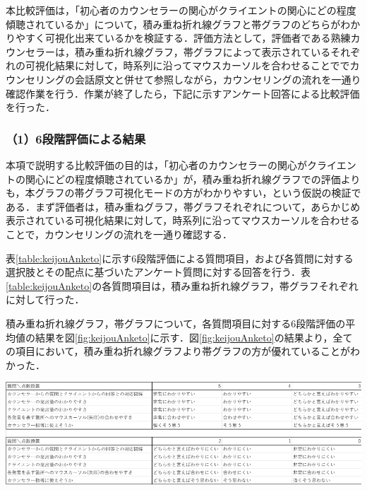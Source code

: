 \documentclass[shuuron]{kuee}
\begin{document}
本比較評価は，「初心者のカウンセラーの関心がクライエントの関心にどの程度傾聴されているか」について，積み重ね折れ線グラフと帯グラフのどちらがわかりやすく可視化出来ているかを検証する．評価方法として，評価者である熟練カウンセラーは，積み重ね折れ線グラフ，帯グラフによって表示されているそれぞれの可視化結果に対して，時系列に沿ってマウスカーソルを合わせることででカウンセリングの会話原文と併せて参照しながら，カウンセリングの流れを一通り確認作業を行う．作業が終了したら，下記に示すアンケート回答による比較評価を行った．

\subsubsection{（1）6段階評価による結果}

本項で説明する比較評価の目的は，「初心者のカウンセラーの関心がクライエントの関心にどの程度傾聴されているか」が，積み重ね折れ線グラフでの評価よりも，本グラフの帯グラフ可視化モードの方がわかりやすい，という仮説の検証である．まず評価者は，積み重ねグラフ，帯グラフそれぞれについて，あらかじめ表示されている可視化結果に対して，時系列に沿ってマウスカーソルを合わせることで，カウンセリングの流れを一通り確認する．

表\ref{table:keijouAnketo}に示す6段階評価による質問項目，および各質問に対する選択肢とその配点に基づいたアンケート質問に対する回答を行う．表\ref{table:keijouAnketo}の各質問項目は，積み重ね折れ線グラフ，帯グラフそれぞれに対して行った．


積み重ね折れ線グラフ，帯グラフについて，各質問項目に対する6段階評価の平均値の結果を図\ref{fig:keijouAnketo}に示す．図\ref{fig:keijouAnketo}の結果より，全ての項目において，積み重ね折れ線グラフより帯グラフの方が優れていることがわかった．

\begin{table}
  \caption{可視化手法比較アンケートにおける6段階評価質問}
  \label{table:keijouAnketo}
  \begin{center}
    \includegraphics[width=\linewidth]{point.png}
  \end{center}
\end{table}
\end{document}
